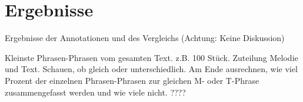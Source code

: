 \chapter{Ergebnisse}
\label{chap:Ergebnisse}
\pagestyle{plain}

Ergebnisse der Annotationen und des Vergleichs (Achtung: Keine Diskussion)

Kleinste Phrasen-Phrasen vom gesamten Text. z.B. 100 Stück. Zuteilung Melodie und Text. Schauen, ob gleich oder unterschiedlich. Am Ende ausrechnen, wie viel Prozent der einzelnen Phrasen-Phrasen zur gleichen M- oder T-Phrase zusammengefasst werden und wie viele nicht. ????


